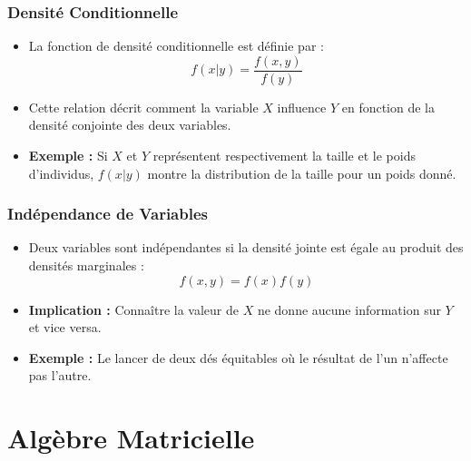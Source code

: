 \documentclass{beamer}
\begin{document}
\begin{frame}
  \frametitle{Densité Conditionnelle}
  \begin{itemize}
    \item La fonction de densité conditionnelle est définie par :
    \[
    f(x|y) = \frac{f(x,y)}{f(y)}
    \]
    \item Cette relation décrit comment la variable \(X\) influence \(Y\) en fonction de la densité conjointe des deux variables.
    \item \textbf{Exemple :} Si \(X\) et \(Y\) représentent respectivement la taille et le poids d'individus, \(f(x|y)\) montre la distribution de la taille pour un poids donné.
  \end{itemize}
\end{frame}

\begin{frame}
  \frametitle{Indépendance de Variables}
  \begin{itemize}
    \item Deux variables sont indépendantes si la densité jointe est égale au produit des densités marginales :
    \[
    f(x,y) = f(x)f(y)
    \]
    \item \textbf{Implication :} Connaître la valeur de \(X\) ne donne aucune information sur \(Y\) et vice versa.
    \item \textbf{Exemple :} Le lancer de deux dés équitables où le résultat de l'un n'affecte pas l'autre.
  \end{itemize}
\end{frame}

\section{Algèbre Matricielle}
\end{document}
